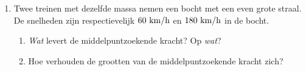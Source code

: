 \begin{enumerate}
\item Twee treinen met dezelfde massa nemen een bocht met een even grote straal. De snelheden zijn respectievelijk $60~\rm km/h$ en
$180~\rm km/h$ in de bocht.
\begin{enumerate}
\item \textit{Wat} levert de middelpuntzoekende kracht? Op
\textit{wat}?
\item Hoe verhouden de grootten van de middelpuntzoekende kracht zich?
\end{enumerate}



\end{enumerate}